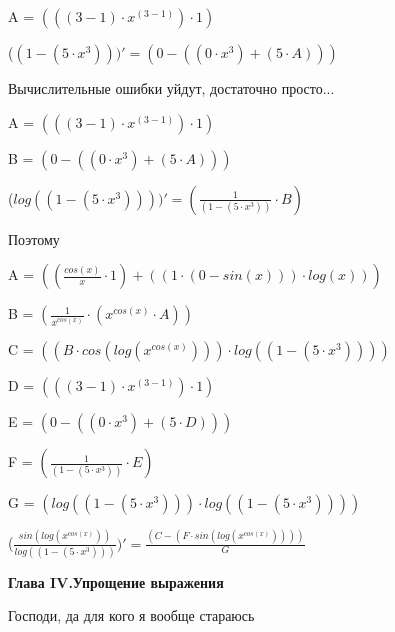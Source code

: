 \documentclass[12pt,a4paper,fleqn]{article}
\begin{document}
\begin{center}
A = $(((3-1) \cdot x^{(3-1)}) \cdot 1)$\end{center}
\begin{center}
 ($(1-(5 \cdot x^{3})))'
  = (0-((0 \cdot x^{3})+(5 \cdot A)))$\end{center}
Вычислительные ошибки уйдут, достаточно просто...

\begin{center}
A = $(((3-1) \cdot x^{(3-1)}) \cdot 1)$\end{center}
\begin{center}
B = $(0-((0 \cdot x^{3})+(5 \cdot A)))$\end{center}
\begin{center}
 ($log((1-(5 \cdot x^{3}))))'
  = (\frac{1}{(1-(5 \cdot x^{3}))} \cdot B)$\end{center}
Поэтому

\begin{center}
A = $((\frac{cos(x)}{x} \cdot 1)+((1 \cdot (0-sin(x))) \cdot log(x)))$\end{center}
\begin{center}
B = $(\frac{1}{x^{cos(x)}} \cdot (x^{cos(x)} \cdot A))$\end{center}
\begin{center}
C = $((B \cdot cos(log(x^{cos(x)}))) \cdot log((1-(5 \cdot x^{3}))))$\end{center}
\begin{center}
D = $(((3-1) \cdot x^{(3-1)}) \cdot 1)$\end{center}
\begin{center}
E = $(0-((0 \cdot x^{3})+(5 \cdot D)))$\end{center}
\begin{center}
F = $(\frac{1}{(1-(5 \cdot x^{3}))} \cdot E)$\end{center}
\begin{center}
G = $(log((1-(5 \cdot x^{3}))) \cdot log((1-(5 \cdot x^{3}))))$\end{center}
\begin{center}
 ($\frac{sin(log(x^{cos(x)}))}{log((1-(5 \cdot x^{3})))})'
  = \frac{(C-(F \cdot sin(log(x^{cos(x)}))))}{G}$\end{center}
\newpage \textbf{\LARGE Глава IV.Упрощение выражения}

Господи, да для кого я вообще стараюсь
\end{document}
